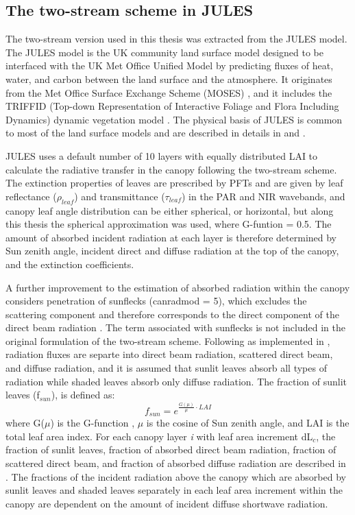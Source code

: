 \subsection{The two-stream scheme in JULES} 

The two-stream version used in this thesis was extracted from the JULES model. The JULES model is the UK community land surface model designed to be interfaced with the UK Met Office Unified Model \citep{Walters2014} by predicting fluxes of heat, water, and carbon between the land surface and the atmosphere. It originates from the Met Office Surface Exchange Scheme (MOSES) \citep{Cox1999}, and it includes the TRIFFID (Top-down Representation of Interactive Foliage and Flora Including Dynamics) dynamic vegetation model \citep{Cox2001}. The physical basis of JULES is common to most of the land surface models and are described in details in \citet{Best2011} and \citet{Clark2011}. 

JULES uses a default number of 10 layers with equally distributed LAI to calculate the radiative transfer in the canopy following the two-stream scheme. The extinction properties of leaves are prescribed by PFTs and are given by leaf reflectance ($\rho_{leaf}$) and transmittance ($\tau_{leaf}$) in the PAR and NIR wavebands, and canopy leaf angle distribution can be either spherical, or horizontal, but along this thesis the spherical approximation was used, where G-funtion = 0.5. The amount of absorbed incident radiation at each layer is therefore determined by Sun zenith angle, incident direct and diffuse radiation at the top of the canopy, and the extinction coefficients.

A further improvement to the estimation of absorbed radiation within the canopy considers penetration of sunflecks (can\textunderscore rad\textunderscore mod = 5), which excludes the scattering component and therefore corresponds to the direct component of the direct beam radiation \citep{Clark2011}. The term associated with sunflecks is not included in the original formulation of the two-stream scheme. Following \citet{Dai2004} as implemented in \citet{Mercado2009}, radiation fluxes are separte into direct beam radiation, scattered direct beam, and diffuse radiation, and it is assumed that sunlit leaves absorb all types of radiation while shaded leaves absorb only diffuse radiation. The fraction of sunlit leaves (f$_{sun}$), is defined as:
\begin{equation}
 f_{sun} = e^{\frac{G(\mu)}{\mu} \cdot LAI}
\end{equation}\label{eq:fsun}
\noindent where G($\mu$) is the G-function \citep{Ross1981}, $\mu$ is the cosine of Sun zenith angle, and LAI is the total leaf area index. For each canopy layer \textit{i} with leaf area increment dL$_c$, the fraction of sunlit leaves, fraction of absorbed direct beam radiation, fraction of scattered direct beam, and fraction of absorbed diffuse radiation are described in \citep{Clark2011}. The fractions of the incident radiation above the canopy which are absorbed by sunlit leaves and shaded leaves separately in each leaf area increment within the canopy are dependent on the amount of incident diffuse shortwave radiation.

